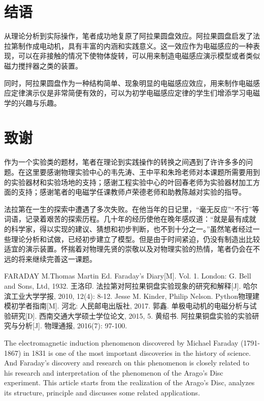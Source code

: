 \documentclass{CLGPY}
\begin{document}
\begin{multicols}{1}
\section{结语}
从理论分析到实际操作，笔者成功地复原了阿拉果圆盘效应。阿拉果圆盘启发了法拉第制作成电动机，具有丰富的内涵和实践意义。这一效应作为电磁感应的一种表现，可以在非接触的情况下使物体旋转，可以用来制造电磁感应演示模型或者类似磁力搅拌器之类的装置。

同时，阿拉果圆盘作为一种结构简单、现象明显的电磁感应效应，用来制作电磁感应定律演示仪是非常简便有效的，可以为初学电磁感应定律的学生们增添学习电磁学的兴趣与乐趣。

\section{致谢}
作为一个实验类的题材，笔者在理论到实践操作的转换之间遇到了许许多多的问题。在这里要感谢物理实验中心的韦先涛、王中平和朱玲老师对本课题所需要用到的实验器材和实验场地的支持；感谢工程实验中心的叶回春老师为实验器材加工方面的支持；感谢笔者的电磁学任课教师卢荣德老师和助教陈越对实验的指导。

法拉第在一生的探索中遭遇了多次失败。在他当年的日记里，“毫无反应”“不行”等词语，记录着艰苦的探索历程。几十年的经历使他在晚年感叹道：“就是最有成就的科学家，得以实现的建议、猜想和初步判断，也不到十分之一。”虽然笔者经过一些理论分析和试做，已经初步建立了模型。但是由于时间紧迫，仍没有制造出比较适宜的演示装置。怀揣着对物理先贤的崇敬以及对物理实验的热情，笔者仍会在不远的将来继续完善这一课题。

\begin{thebibliography}{99}  
FARADAY M.Thomas Martin Ed. Faraday's Diary[M]. Vol. 1. London: G. Bell and Sons, Ltd, 1932.
王洛印. 法拉第对阿拉果铜盘实验现象的研究和解释[J]. 哈尔滨工业大学学报, 2010, 12(4): 8-12.  
Jesse M. Kinder, Philip Nelson. Python物理建模初学者指南[M]. 河北: 人民邮电出版社, 2017.
郭鑫. 单极电动机的电磁分析与试验研究[D]. 西南交通大学硕士学位论文, 2015, 5. 
黄绍书. 阿拉果铜盘实验的实验研究与分析[J]. 物理通报, 2016(7): 97-100.
\end{thebibliography}

\end{multicols}
\Maketitle
\begin{enabstract}
    The electromagnetic induction phenomenon discovered by Michael Faraday (1791-1867) in 1831 is one of the most important discoveries in the history of science. And Faraday's discovery and research on this phenomenon is closely related to his research and interpretation of the phenomenon of the Arago's Disc experiment. This article starts from the realization of the Arago's Disc, analyzes its structure, principle and discusses some related applications.
    
\end{enabstract}
\end{document}
